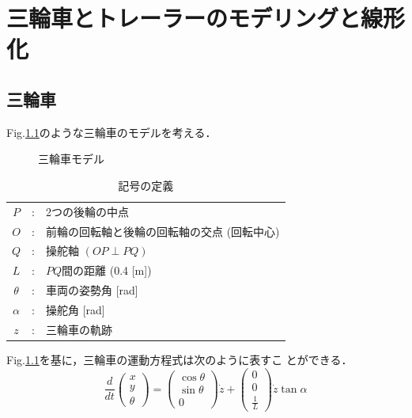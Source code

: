 \chapter{三輪車とトレーラーのモデリングと線形化}

\section{三輪車}
Fig.\ref{fig:tricyclemodel}のような三輪車のモデルを考える．
\begin{figure}[htbp]
 \begin{center}
  \caption{三輪車モデル}
  \label{fig:tricyclemodel}
 \end{center}
\end{figure}
\begin{table}[H]
 \begin{center}
 \caption{記号の定義}
 \begin{tabular}{ccl}\hline
  $P$ & : & 2つの後輪の中点 \\
  $O$ & : & 前輪の回転軸と後輪の回転軸の交点 (回転中心) \\
  $Q$ & : & 操舵軸 $(OP \perp PQ)$ \\
  $L$ & : & $PQ$間の距離 (0.4 [m]) \\
  $\theta$ & : & 車両の姿勢角 [rad] \\
  $\alpha$ & : & 操舵角 [rad] \\
  $z$ & : & 三輪車の軌跡
 \end{tabular}
 \end{center}
\end{table}
Fig.\ref{fig:tricyclemodel}を基に，三輪車の運動方程式は次のように表すこ
とができる．
\begin{equation}
\frac{d}{dt}
 \left(
  \begin{array}{c}
   x \\
   y \\
   \theta 
  \end{array}
 \right) =
 \left(
  \begin{array}{c}
   \cos \theta \\
   \sin \theta \\
   0
  \end{array}
 \right) \dot{z} +
 \left(
  \begin{array}{c}
   0 \\
   0 \\
   \frac{1}{L}
  \end{array}
 \right) \dot{z} \tan \alpha
\end{equation}

